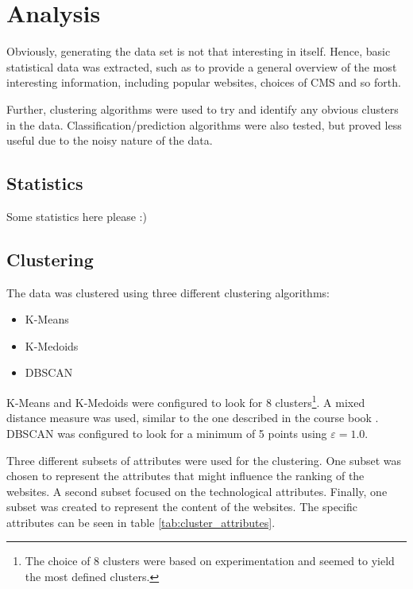\section{Analysis}
\label{sec:analysis}


Obviously, generating the data set is not that interesting in itself. Hence, basic statistical data was extracted, such as to provide a general overview of the most interesting information, including popular websites, choices of CMS and so forth. 

Further, clustering algorithms were used to try and identify any obvious clusters in the data. Classification/prediction algorithms were also tested, but proved less useful due to the noisy nature of the data. 

\subsection{Statistics}
\label{subsec:statistics}

Some statistics here please :)

\subsection{Clustering}
\label{subsec:clustering}

The data was clustered using three different clustering algorithms:

\begin{itemize}
\item K-Means
\item K-Medoids
\item DBSCAN
\end{itemize}

K-Means and K-Medoids were configured to look for 8 clusters\footnote{The choice of 8 clusters were based on experimentation and seemed to yield the most defined clusters.}. A mixed distance measure was used, similar to the one described in the course book \cite{book}. DBSCAN was configured to look for a minimum of 5 points using $\varepsilon = 1.0$.

Three different subsets of attributes were used for the clustering. One subset was chosen to represent the attributes that might influence the ranking of the websites. A second subset focused on the technological attributes. Finally, one subset was created to represent the content of the websites. The specific attributes can be seen in table \ref{tab:cluster_attributes}.


